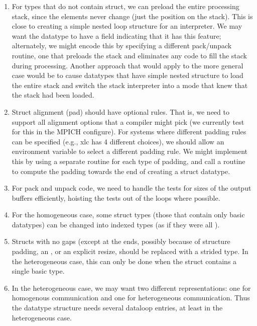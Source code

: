 \documentclass{article}
\begin{document}
\begin{enumerate}
\item For types that do not contain struct, we can preload the entire
   processing stack, since the elements never change (just the
   position on the stack).  This is close to creating a simple nested
   loop structure for an interpreter.  We may want the datatype to
   have a field indicating that it has this feature; alternately, we
   might encode this by specifying a different pack/unpack routine,
   one that preloads the stack and eliminates any code to fill the
   stack during processing.  Another approach that would apply to the
   more general case would be to cause datatypes that have simple
   nested structure to load the entire stack and switch the stack
   interpreter into a mode that knew that the stack had been loaded.

\item Struct alignment (pad) should have optional rules.  That is, we
   need to support all alignment options that a compiler might pick
   (we currently test for this in the MPICH configure).  For systems
   where different padding rules can be specified (e.g., xlc has 4
   different choices), we should allow an environment variable to
   select a different padding rule.  We might implement this by using
   a separate routine for each type of padding, and call a routine to
   compute the padding towards the end of creating a struct datatype.

\item For pack and unpack code, we need to handle the tests for sizes of
    the output buffers efficiently, hoisting the tests out of the
    loops where possible.  

\item For the homogeneous case, some struct types (those that contain
    only basic datatypes) can be changed into indexed types (as if
    they were all ).

\item Structs with no gaps (except at the ends, possibly because of 
    structure padding, an , or an explicit resize,
    should be replaced with a strided type.  In the heterogeneous
    case, this can only be done when the struct contains a single
    basic type.

\item In the heterogeneous case, we may want two different
    representations: one for homogenous communication and one for
    heterogeneous communication.  Thus the datatype structure needs
    several dataloop entries, at least in the heterogeneous case.

\end{enumerate}
\end{document}
